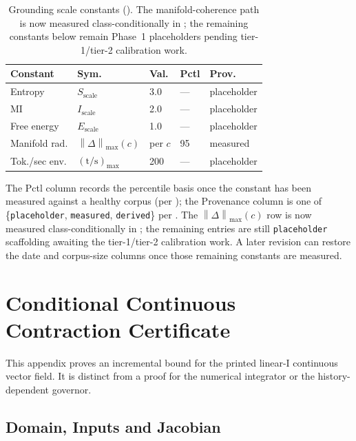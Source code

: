\documentclass[11pt,twocolumn]{article}
\newcommand{\norm}[1]{\left\lVert #1 \right\rVert}
\begin{document}
\begin{table}[htbp]
\centering
\footnotesize
\caption{Grounding scale constants (). The
manifold-coherence path is now measured class-conditionally in
; the remaining constants below remain
Phase~1 placeholders pending tier-1/tier-2 calibration work.}
\label{tab:scale-constants}
\setlength{\tabcolsep}{3pt}
\begin{tabular}{@{}lllll@{}}
\toprule
\textbf{Constant} & \textbf{Sym.} & \textbf{Val.} & \textbf{Pctl} & \textbf{Prov.} \\
\midrule
Entropy & $S_{\text{scale}}$ & 3.0 & --- & placeholder \\
MI & $I_{\text{scale}}$ & 2.0 & --- & placeholder \\
Free energy & $E_{\text{scale}}$ & 1.0 & --- & placeholder \\
Manifold rad. & $\norm{\Delta}_{\max}(c)$ & per $c$ & 95 & measured \\
Tok./sec env. & $(\text{t/s})_{\max}$ & 200 & --- & placeholder \\
\bottomrule
\end{tabular}
\end{table}

The Pctl column records the percentile basis once the constant
has been measured against a healthy corpus (per
); the Provenance column is one of
\{\texttt{placeholder}, \texttt{measured}, \texttt{derived}\}
per . The $\norm{\Delta}_{\max}(c)$ row is now
measured class-conditionally in ; the remaining
entries are still \texttt{placeholder} scaffolding awaiting the
tier-1/tier-2 calibration work. A later revision can restore the
date and corpus-size columns once those remaining constants are
measured.


\section{Conditional Continuous Contraction Certificate}
\label{app:contraction-proof}

This appendix proves an incremental bound for the printed
linear-I continuous vector field. It is distinct from a proof
for the numerical integrator or the history-dependent governor.

\subsection*{Domain, Inputs and Jacobian}
\end{document}
